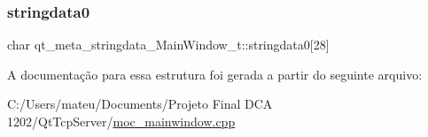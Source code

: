 \subsubsection{\texorpdfstring{stringdata0}{stringdata0}}
{\footnotesize\ttfamily char qt\+\_\+meta\+\_\+stringdata\+\_\+\+Main\+Window\+\_\+t\+::stringdata0\mbox{[}28\mbox{]}}



A documentação para essa estrutura foi gerada a partir do seguinte arquivo\+:\begin{DoxyCompactItemize}
\item 
C\+:/\+Users/mateu/\+Documents/\+Projeto Final D\+C\+A 1202/\+Qt\+Tcp\+Server/\mbox{\hyperlink{moc__mainwindow_8cpp}{moc\+\_\+mainwindow.\+cpp}}\end{DoxyCompactItemize}
